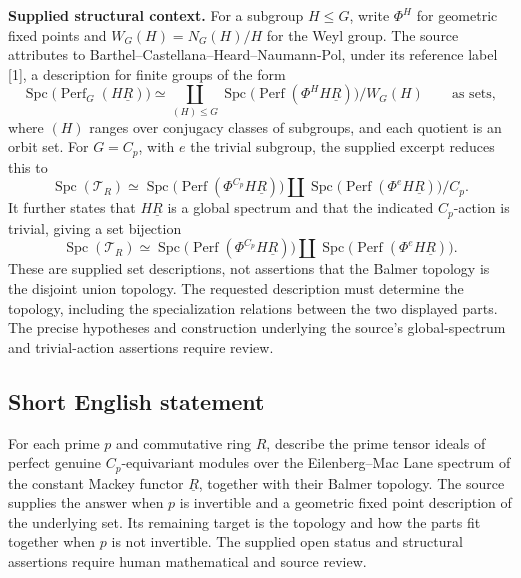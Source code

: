 \documentclass[11pt]{article}
\begin{document}
\textbf{Supplied structural context.} For a subgroup \(H\leq G\), write \(\Phi^H\) for geometric fixed points and \(W_G(H)=N_G(H)/H\) for the Weyl group. The source attributes to Barthel--Castellana--Heard--Naumann-Pol, under its reference label [1], a description for finite groups of the form
\[
\operatorname{Spc}\bigl(\operatorname{Perf}_{G}(H\underline R)\bigr)
\simeq
\coprod_{(H)\leq G}
\operatorname{Spc}\bigl(\operatorname{Perf}(\Phi^H H\underline R)\bigr)/W_G(H)
\qquad\text{as sets},
\]
where \((H)\) ranges over conjugacy classes of subgroups, and each quotient is an orbit set. For \(G=C_p\), with \(e\) the trivial subgroup, the supplied excerpt reduces this to
\[
\operatorname{Spc}(\mathcal T_R)
\simeq
\operatorname{Spc}\bigl(\operatorname{Perf}(\Phi^{C_p}H\underline R)\bigr)
\amalg
\operatorname{Spc}\bigl(\operatorname{Perf}(\Phi^eH\underline R)\bigr)/C_p.
\]
It further states that \(H\underline R\) is a global spectrum and that the indicated \(C_p\)-action is trivial, giving a set bijection
\[
\operatorname{Spc}(\mathcal T_R)
\simeq
\operatorname{Spc}\bigl(\operatorname{Perf}(\Phi^{C_p}H\underline R)\bigr)
\amalg
\operatorname{Spc}\bigl(\operatorname{Perf}(\Phi^eH\underline R)\bigr).
\]
These are supplied set descriptions, not assertions that the Balmer topology is the disjoint union topology. The requested description must determine the topology, including the specialization relations between the two displayed parts. The precise hypotheses and construction underlying the source's global-spectrum and trivial-action assertions require review.
\subsection{Short English statement}
For each prime \(p\) and commutative ring \(R\), describe the prime tensor ideals of perfect genuine \(C_p\)-equivariant modules over the Eilenberg--Mac Lane spectrum of the constant Mackey functor \(\underline R\), together with their Balmer topology. The source supplies the answer when \(p\) is invertible and a geometric fixed point description of the underlying set. Its remaining target is the topology and how the parts fit together when \(p\) is not invertible. The supplied open status and structural assertions require human mathematical and source review.
\end{document}
